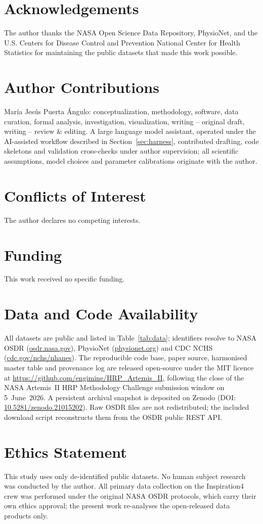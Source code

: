 \documentclass[11pt,a4paper,3p,authoryear]{elsarticle}
\begin{document}
\section*{Acknowledgements}
The author thanks the NASA Open Science Data Repository, PhysioNet, and the U.S. Centers for Disease Control and Prevention National Center for Health Statistics for maintaining the public datasets that made this work possible.

\section*{Author Contributions}\label{sec:author-contributions}
Mar\'ia Jes\'us Puerta \'Angulo: conceptualization, methodology, software, data curation, formal analysis, investigation, visualization, writing -- original draft, writing -- review \& editing. A large language model assistant, operated under the AI-assisted workflow described in Section~\ref{sec:harness}, contributed drafting, code skeletons and validation cross-checks under author supervision; all scientific assumptions, model choices and parameter calibrations originate with the author.

\section*{Conflicts of Interest}
The author declares no competing interests.

\section*{Funding}
This work received no specific funding.

\section*{Data and Code Availability}
All datasets are public and listed in Table~\ref{tab:data}; identifiers resolve to NASA OSDR (\url{osdr.nasa.gov}), PhysioNet (\url{physionet.org}) and CDC NCHS (\url{cdc.gov/nchs/nhanes}). The reproducible code base, paper source, harmonised master table and provenance log are released open-source under the MIT licence at \url{https://github.com/engimine/HRP_Artemis_II}, following the close of the NASA Artemis~II HRP Methodology Challenge submission window on \mbox{5~June~2026}. A persistent archival snapshot is deposited on Zenodo (DOI: \href{https://doi.org/10.5281/zenodo.21015202}{10.5281/zenodo.21015202}). Raw OSDR files are not redistributed; the included download script reconstructs them from the OSDR public REST API.

\section*{Ethics Statement}
This study uses only de-identified public datasets. No human subject research was conducted by the author. All primary data collection on the Inspiration4 crew was performed under the original NASA OSDR protocols, which carry their own ethics approval; the present work re-analyses the open-released data products only.


\end{document}

